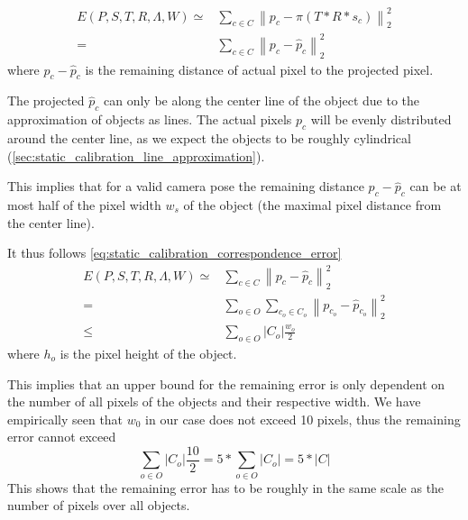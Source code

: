 \begin{equation}
  \label{eq:static_calibration_correspondence_error}
  \begin{split}
  E(P, S, T, R, \Lambda, W ) \simeq &
  \sum_{c \in C} 
  \left\lVert 
     p_c - \pi(T * R * s_c) 
  \right\rVert_2^2  \\
  = & 
  \sum_{c \in C} 
  \left\lVert 
     p_c - \hat{p}_c 
  \right\rVert_2^2 
  \end{split}
\end{equation}
where $p_c - \hat{p}_c$ is the remaining distance of actual pixel to the projected pixel.

The projected $\hat{p}_c$ can only be along the center line of the object due to the approximation of objects as lines.
The actual pixels $p_c$ will be evenly distributed around the center line, as we expect the objects to be roughly cylindrical (\autoref{sec:static_calibration_line_approximation}).

This implies that for a valid camera pose the remaining distance $p_c - \hat{p}_c$ can be at most half of the pixel width $w_s$ of the object (the maximal pixel distance from the center line).

It thus follows \autoref{eq:static_calibration_correspondence_error} 
\begin{equation}
  \label{eq:static_calibration_correspondence_error_scale}
  \begin{split}
  E(P, S, T, R, \Lambda, W ) \simeq  &
  \sum_{c \in C} 
  \left\lVert 
     p_c - \hat{p}_c 
  \right\rVert_2^2 \\
  = & 
  \sum_{o \in O} 
  \sum_{c_o \in C_o} 
  \left\lVert 
     p_{c_o} - \hat{p}_{c_o} 
  \right\rVert_2^2 \\
  \leq &
  \sum_{o \in O} \left\lvert C_o \right\rvert \frac{w_o}{2} 
  \end{split}
\end{equation}
where $h_o$ is the pixel height of the object.

This implies that an upper bound for the remaining error is only dependent on the number of all pixels of the objects and their respective width.
We have empirically seen that $w_0$ in our case does not exceed 10 pixels, thus the remaining error cannot exceed 
\begin{equation}
  \sum_{o \in O} \left\lvert C_o \right\rvert \frac{10}{2} = 5 * \sum_{o \in O} \left\lvert C_o \right\rvert = 5 * \left\lvert C \right\rvert 
\end{equation}
This shows that the remaining error has to be roughly in the same scale as the number of pixels over all objects. 

